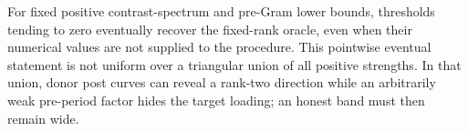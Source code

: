 For fixed positive contrast-spectrum and pre-Gram lower bounds, thresholds tending to zero eventually recover the fixed-rank oracle, even when their numerical values are not supplied to the procedure.  This pointwise eventual statement is not uniform over a triangular union of all positive strengths.  In that union, donor post curves can reveal a rank-two direction while an arbitrarily weak pre-period factor hides the target loading; an honest band must then remain wide.